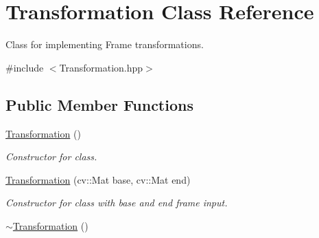 \hypertarget{classTransformation}{}\section{Transformation Class Reference}
\label{classTransformation}


Class for implementing Frame transformations.  




{\ttfamily \#include $<$Transformation.\+hpp$>$}

\subsection*{Public Member Functions}
\begin{DoxyCompactItemize}
\item 
\hyperlink{classTransformation_a40ab64d41c752804740e972ef5f2479f}{Transformation} ()
\begin{DoxyCompactList}\small\item\em Constructor for class. \end{DoxyCompactList}\item 
\hyperlink{classTransformation_a919fd564686f686ff8060fc85d14e3f7}{Transformation} (cv\+::\+Mat base, cv\+::\+Mat end)
\begin{DoxyCompactList}\small\item\em Constructor for class with base and end frame input. \end{DoxyCompactList}\item 
\hyperlink{classTransformation_ade11a9f133b2acd81ae9383187cc255e}{$\sim$\+Transformation} ()\hypertarget{classTransformation_ade11a9f133b2acd81ae9383187cc255e}{}\label{classTransformation_ade11a9f133b2acd81ae9383187cc255e}


\end{DoxyCompactItemize}
